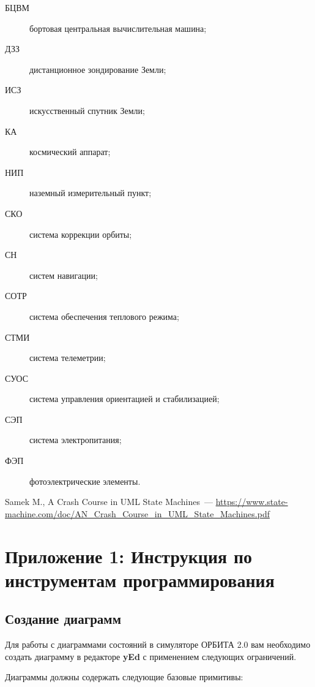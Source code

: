 \documentclass[12pt,a4paper]{article}
\begin{document}
\begin{description}
\item[БЦВМ] бортовая центральная вычислительная машина;
\item[ДЗЗ] дистанционное зондирование Земли;
\item[ИСЗ] искусственный спутник Земли;
\item[КА] космический аппарат;
\item[НИП] наземный измерительный пункт;
\item[СКО] система коррекции орбиты;
\item[СН] систем навигации;
\item[СОТР] система обеспечения теплового режима;
\item[СТМИ] система телеметрии;
\item[СУОС] система управления ориентацией и стабилизацией;
\item[СЭП] система электропитания;
\item[ФЭП] фотоэлектрические элементы.
\end{description}

\begin{thebibliography}{2}
 Samek M., A Crash Course in UML State Machines~---
  \url{https://www.state-machine.com/doc/AN_Crash_Course_in_UML_State_Machines.pdf}
\end{thebibliography}

\clearpage
\section*{Приложение 1: Инструкция по инструментам программирования}

\subsection*{Создание диаграмм}

Для работы с диаграммами состояний в симуляторе ОРБИТА 2.0 вам необходимо создать
диаграмму в редакторе \textbf{yEd} с применением следующих ограничений.

Диаграммы должны содержать следующие базовые примитивы:
\end{document}
